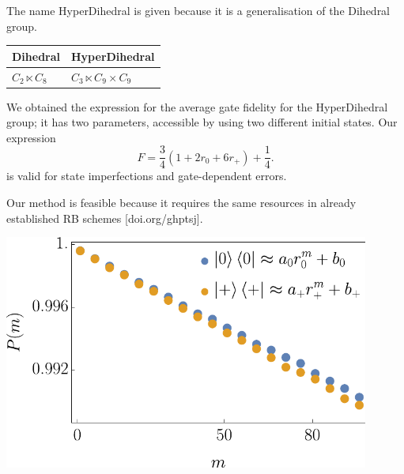 \documentclass[12pt]{article}
\newcommand{\myref}[1] {[{\color{gray}doi.org/}#1]}
\begin{document}
\begin{tcbposter}
{\begin{minipage}{0.45\linewidth}
The name HyperDihedral is given because it is a
generalisation of the Dihedral group.

\begin{center}
\begin{tabular}{l|l}
Dihedral          & HyperDihedral                 \\
\hline
$C_2 \ltimes C_8$ & $ C_3 \ltimes C_9 \times C_9$
\end{tabular}
\end{center}

\par
We obtained the expression for the average gate fidelity 
for the HyperDihedral group;
it has two parameters, accessible by using two different initial states.
Our expression 
\begin{equation*}
    \textstyle F = \frac{3}{4}(1+2r_0 + 6 r_+) + \frac{1}{4}.
\end{equation*}
is valid for state imperfections and gate-dependent errors.
\par
Our method is feasible because it requires the same resources in already established 
RB schemes \myref{ghptsj}.
\end{minipage}
\hspace{0.02\textwidth}
\begin{minipage}{0.45\linewidth}
\begin{center}
\includegraphics[width=0.9\textwidth]{auxiliary figures/simulation.pdf}
\end{center}
\end{minipage}
}


\end{tcbposter}
\end{document}
